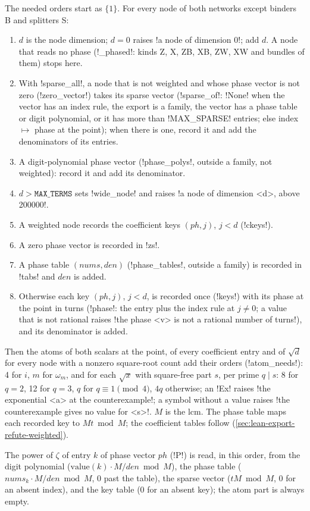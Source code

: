 {{{\begin{algorithm}\label{alg:lean-export-refute-order}
The needed orders start as $\{1\}$. For every node of both networks except binders B and
splitters S:
\begin{enumerate}
\item $d$ is the node dimension; $d = 0$ raises \lexcode!a node of dimension 0!; add $d$. A node
that reads no phase (\lexpy!_phased!: kinds Z, X, ZB, XB, ZW, XW and bundles of them) stops here.
\item With \lexpy!sparse_all!, a node that is not weighted and whose phase vector is not zero
(\lexpy!zero_vector!) takes its sparse vector (\lexpy!sparse_of!: \lexpy!None! when the vector has an
index rule, the export is a family, the vector has a phase table or digit polynomial, or it has
more than \lexpy!MAX_SPARSE! entries; else index $\mapsto$ phase at the point); when there is one,
record it and add the denominators of its entries.
\item A digit-polynomial phase vector (\lexpy!phase_polys!, outside a family, not weighted): record
it and add its denominator.
\item $d > \mathtt{MAX\_TERMS}$ sets \lexpy!wide_node! and raises
\lexcode!a node of dimension <d>, above 200000!.
\item A weighted node records the coefficient keys $(ph, j)$, $j < d$ (\lexpy!ckeys!).
\item A zero phase vector is recorded in \lexpy!zs!.
\item A phase table $(nums, den)$ (\lexpy!phase_tables!, outside a family) is recorded in \lexpy!tabs!
and $den$ is added.
\item Otherwise each key $(ph, j)$, $j < d$, is recorded once (\lexpy!keys!) with its phase at the
point in turns (\lexpy!phase!: the entry plus the index rule at $j \ne 0$; a value that is not
rational raises \lexcode!the phase <v> is not a rational number of turns!), and its denominator is
added.
\end{enumerate}
Then the atoms of both scalars at the point, of every coefficient entry and of $\sqrt d$ for
every node with a nonzero square-root count add their orders (\lexpy!atom_needs!): 4 for $i$, $m$
for $\omega_m$, and for each $\sqrt x$ with square-free part $s$, per prime $q \mid s$: 8 for
$q = 2$, 12 for $q = 3$, $q$ for $q \equiv 1 \pmod 4$, $4q$ otherwise; an \lexpy!Ex! raises
\lexcode!the exponential <a> at the counterexample!; a symbol without a value raises
\lexcode!the counterexample gives no value for <s>!. $M$ is the lcm. The phase table maps each
recorded key to $Mt \bmod M$; the coefficient tables follow
(\cref{sec:lean-export-refute-weighted}).
\end{algorithm}
The power of $\zeta$ of entry $k$ of phase vector $ph$ (\lexpy!P!) is read, in this order, from the
digit polynomial ($\mathrm{value}(k)\cdot M/den \bmod M$), the phase table
($nums_k \cdot M/den \bmod M$, 0 past the table), the sparse vector ($tM \bmod M$, 0 for an
absent index), and the key table (0 for an absent key); the atom part is always empty.

}}}
